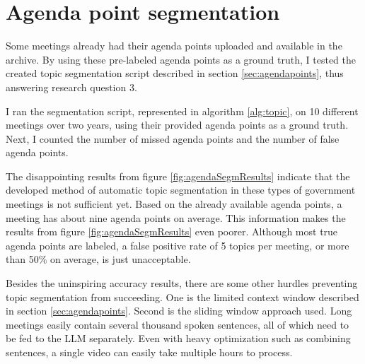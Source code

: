 \documentclass[twoside]{uva-inf-bachelor-thesis}
\begin{document}
\section{Agenda point segmentation}
Some meetings already had their agenda points uploaded and available in the archive. By using these pre-labeled agenda points as a ground truth, I tested the created topic segmentation script described in section \ref{sec:agendapoints}, thus answering research question 3.

I ran the segmentation script, represented in algorithm \ref{alg:topic}, on 10 different meetings over two years, using their provided agenda points as a ground truth. Next, I counted the number of missed agenda points and the number of false agenda points.

The disappointing results from figure \ref{fig:agendaSegmResults} indicate that the developed method of automatic topic segmentation in these types of government meetings is not sufficient yet. Based on the already available agenda points, a meeting has about nine agenda points on average. This information makes the results from figure \ref{fig:agendaSegmResults} even poorer. Although most true agenda points are labeled, a false positive rate of 5 topics per meeting, or more than 50\% on average, is just unacceptable.

Besides the uninspiring accuracy results, there are some other hurdles preventing topic segmentation from succeeding. One is the limited context window described in section \ref{sec:agendapoints}. 
Second is the sliding window approach used. Long meetings easily contain several thousand spoken sentences, all of which need to be fed to the LLM separately. Even with heavy optimization such as combining sentences, a single video can easily take multiple hours to process.
\end{document}
